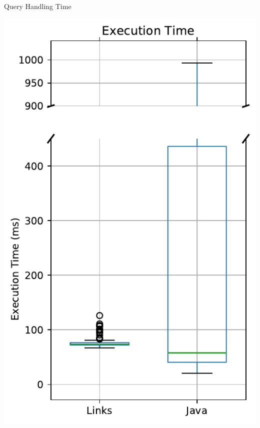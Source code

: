 \documentclass[11.5pt, aspectratio=169]{beamer}
\begin{document}
\begin{frame}{Query Handling Time}

  \begin{minipage}[t]{0.45\textwidth}
    \centering
    \includegraphics[scale=0.4]{images/objectdisplay_querytime_box.pdf}


\end{minipage}
\end{frame}
\end{document}
